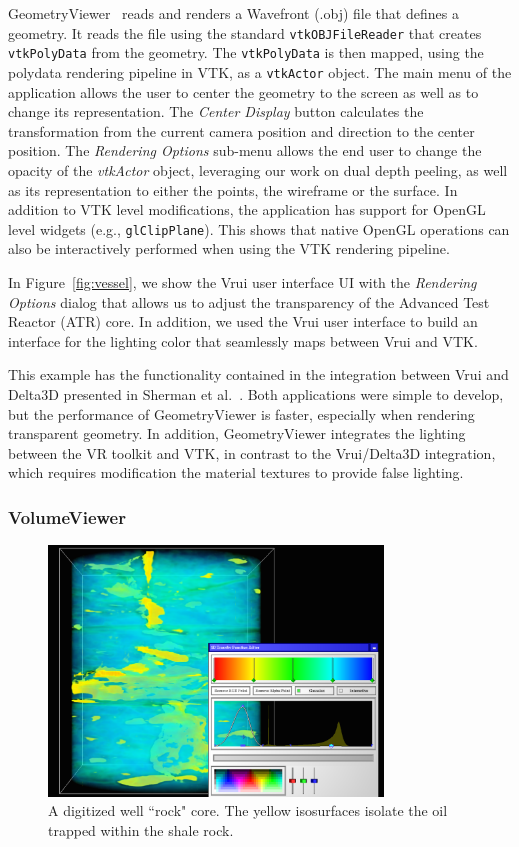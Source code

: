 GeometryViewer~\cite{GeometryViewer} reads and renders a Wavefront (.obj) file that defines a geometry.
It reads the file using the standard \texttt{vtkOBJFileReader} that creates \texttt{vtkPolyData} from the geometry.
The \texttt{vtkPolyData} is then mapped, using the polydata rendering pipeline in VTK, as a \texttt{vtkActor} object.
The main menu of the application allows the user to center the geometry to the screen as well as to change its representation.
The \textit{Center Display} button calculates the transformation from the current camera position and direction to the center position.
The \textit{Rendering Options} sub-menu allows the end user to change the opacity of the \textit{vtkActor} object, leveraging our work on dual depth peeling, as well as its representation to either the points, the wireframe or the surface.
In addition to VTK level modifications, the application has support for OpenGL level widgets (e.g., \texttt{glClipPlane}).
This shows that native OpenGL operations can also be interactively performed when using the VTK rendering pipeline.

In Figure~\ref{fig:vessel}, we show the Vrui user interface UI with the \textit{Rendering Options} dialog that allows us to adjust the transparency of the Advanced Test Reactor (ATR) core. In addition, we used the Vrui user interface to build an interface for the lighting color that seamlessly maps between Vrui and VTK.

This example has the functionality contained in the integration between Vrui and Delta3D presented in Sherman et al.~\cite{Sherman:2010}. Both applications were simple to develop, but the performance of GeometryViewer is faster, especially when rendering transparent geometry. In addition, GeometryViewer integrates the lighting between the VR toolkit and VTK, in contrast to the Vrui/Delta3D integration, which requires modification the material textures to provide false lighting.

\subsubsection{VolumeViewer}

\begin{figure}[h!]
 \centering
 \includegraphics[width=3.5in]{images/rock-transferfunction.png}
 \caption{A digitized well ``rock" core. The yellow isosurfaces isolate the oil trapped within the shale rock.}
 \label{fig:volume}
\end{figure}


